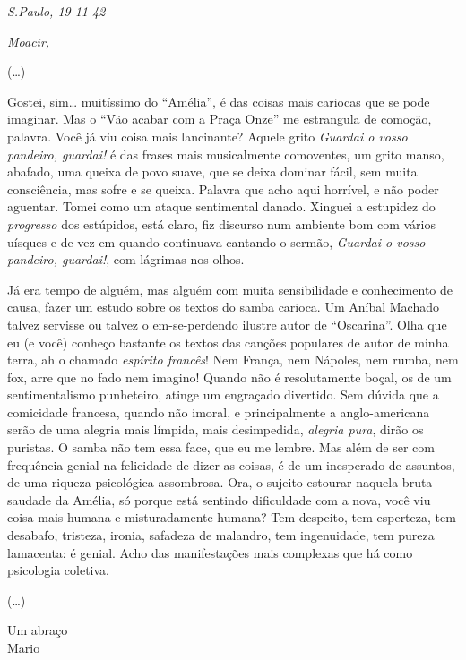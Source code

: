 \begin{flushright}
\emph{S.Paulo, 19-11-42}
\end{flushright}

\emph{Moacir,}

(\ldots{})

Gostei, sim\ldots{} muitíssimo do ``Amélia'', é das coisas mais cariocas
que se pode imaginar. Mas o ``Vão acabar com a Praça Onze'' me estrangula de
comoção, palavra. Você já viu coisa mais lancinante? Aquele grito
\textit{Guardai o vosso pandeiro, guardai!} é das frases mais musicalmente
comoventes, um grito manso, abafado, uma queixa de povo suave, que se
deixa dominar fácil, sem muita consciência, mas sofre e se queixa.
Palavra que acho aqui horrível, e não poder aguentar. Tomei como um
ataque sentimental danado. Xinguei a estupidez do \textit{progresso} dos
estúpidos, está claro, fiz discurso num ambiente bom com vários uísques
e de vez em quando continuava cantando o sermão, \textit{Guardai o vosso
pandeiro, guardai!}, com lágrimas nos olhos.

Já era tempo de alguém, mas alguém com muita sensibilidade e
conhecimento de causa, fazer um estudo sobre os textos do samba carioca.
Um Aníbal Machado talvez servisse ou talvez o em-se-perdendo ilustre
autor de ``Oscarina''. Olha que eu (e você) conheço bastante os
textos das canções populares de autor de minha terra, ah o chamado
\textit{espírito francês}! Nem França, nem Nápoles, nem rumba, nem fox, arre
que no fado nem imagino! Quando não é resolutamente boçal, os de um
sentimentalismo punheteiro, atinge um engraçado divertido. Sem dúvida
que a comicidade francesa, quando não imoral, e principalmente a
anglo-americana serão de uma alegria mais límpida, mais desimpedida,
\textit{alegria pura}, dirão os puristas. O samba não tem essa face, que eu me
lembre. Mas além de ser com frequência genial na felicidade de dizer as
coisas, é de um inesperado de assuntos, de uma riqueza psicológica
assombrosa. Ora, o sujeito estourar naquela bruta saudade da Amélia, só
porque está sentindo dificuldade com a nova, você viu coisa mais humana
e misturadamente humana? Tem despeito, tem esperteza, tem desabafo,
tristeza, ironia, safadeza de malandro, tem ingenuidade, tem pureza
lamacenta: é genial. Acho das manifestações mais complexas que há como
psicologia coletiva.

(\ldots{})

\begin{flushright}
Um abraço\\
Mario
\end{flushright}


